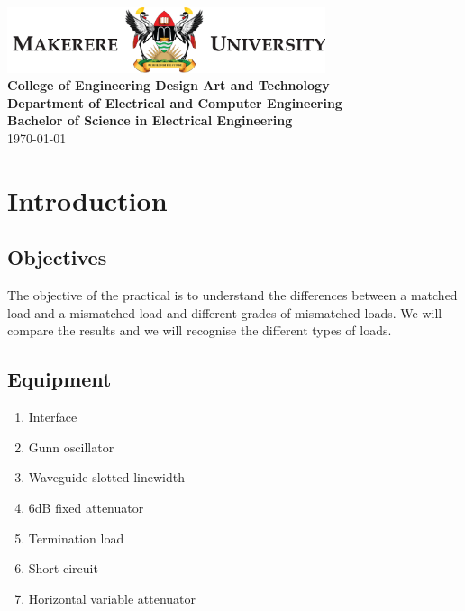 \documentclass{report}
\begin{document}
\begin{titlepage}
\begin{center}
        \vfill
        \includegraphics[width=0.7\textwidth]{makLogo.png}\\
        \vspace{0.4cm}
        {\Large\bfseries College of Engineering Design Art and Technology}\\ 
        \vspace{0.4cm}
        {\Large\bfseries Department of Electrical and Computer Engineering}\\
        \vspace{0.4cm}
        {\Large\bfseries Bachelor of Science in Electrical Engineering}\\
        \vfill
        {\today}
        \end{center}
    \end{titlepage}

    \tableofcontents
    \chapter{Introduction}
    \section{Objectives}
    The objective of the practical is to understand the differences between a matched load and a mismatched load and different grades of mismatched loads. We will compare the results and we will recognise the different types of loads.

    \section{Equipment}
    \begin{enumerate}
        \item Interface
        \item Gunn oscillator
        \item Waveguide slotted linewidth
        \item 6dB fixed attenuator
        \item Termination load
        \item Short circuit
        \item Horizontal variable attenuator
    \end{enumerate}
\end{document}
